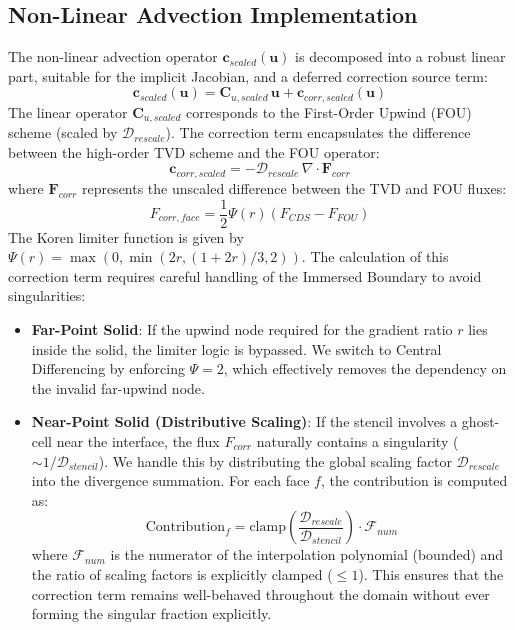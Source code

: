 \documentclass[preprint,12pt]{elsarticle}
\begin{document}
\subsection{Non-Linear Advection Implementation}
The non-linear advection operator $\mathbf{c}_{scaled}(\mathbf{u})$ is decomposed into a robust linear part, suitable for the implicit Jacobian, and a deferred correction source term:
\begin{equation}
    \mathbf{c}_{scaled}(\mathbf{u}) = \mathbf{C}_{u,scaled} \, \mathbf{u} + \mathbf{c}_{corr, scaled}(\mathbf{u})
\end{equation}
The linear operator $\mathbf{C}_{u,scaled}$ corresponds to the First-Order Upwind (FOU) scheme (scaled by $\mathcal{D}_{rescale}$). The correction term encapsulates the difference between the high-order TVD scheme and the FOU operator:
\begin{equation}
    \mathbf{c}_{corr, scaled} = -\mathcal{D}_{rescale} \, \nabla \cdot  \mathbf{F}_{corr}
\end{equation}
where $\mathbf{F}_{corr}$ represents the unscaled difference between the TVD and FOU fluxes:
\begin{equation}
   F_{corr, face} = \frac{1}{2} \Psi(r) (F_{CDS} - F_{FOU})
\end{equation}
The Koren limiter function is given by $\Psi(r) = \max \left( 0, \min \left( 2r, (1+2r)/3, 2 \right) \right)$. The calculation of this correction term requires careful handling of the Immersed Boundary to avoid singularities:
\begin{itemize}
    \item \textbf{Far-Point Solid}: If the upwind node required for the gradient ratio $r$ lies inside the solid, the limiter logic is bypassed. We switch to Central Differencing by enforcing $\Psi=2$, which effectively removes the dependency on the invalid far-upwind node.
    \item \textbf{Near-Point Solid (Distributive Scaling)}: If the stencil involves a ghost-cell near the interface, the flux $F_{corr}$ naturally contains a singularity ($\sim 1/\mathcal{D}_{stencil}$). We handle this by distributing the global scaling factor $\mathcal{D}_{rescale}$ into the divergence summation. For each face $f$, the contribution is computed as:
    \begin{equation}
        \text{Contribution}_f = \text{clamp}\left( \frac{\mathcal{D}_{rescale}}{\mathcal{D}_{stencil}} \right) \cdot \mathcal{F}_{num}
    \end{equation}
    where $\mathcal{F}_{num}$ is the numerator of the interpolation polynomial (bounded) and the ratio of scaling factors is explicitly clamped ($\le 1$). This ensures that the correction term remains well-behaved throughout the domain without ever forming the singular fraction explicitly.
\end{itemize}
\end{document}
